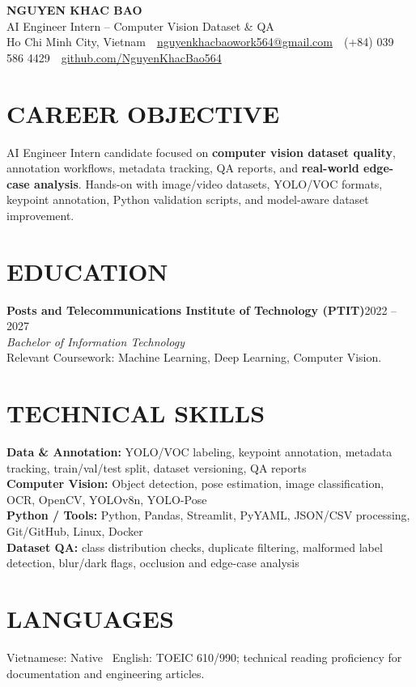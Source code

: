 \documentclass[10pt,a4paper]{article}
\newcommand{\entryhead}[2]{%
    \noindent\textbf{#1}\hfill #2\\[-2pt]
}
\newcommand{\entrysub}[1]{%
    \noindent\textit{#1}\\[-1pt]
}
\begin{document}
\fontsize{9.25}{10.15}\selectfont

\begin{center}
    {\Large\textbf{NGUYEN KHAC BAO}}\\[-1pt]
    AI Engineer Intern -- Computer Vision Dataset \& QA\\[2pt]
    Ho Chi Minh City, Vietnam
    \,\textbar\,
    \href{mailto:nguyenkhacbaowork564@gmail.com}{nguyenkhacbaowork564@gmail.com}
    \,\textbar\,
    (+84) 039 586 4429
    \,\textbar\,
    \href{https://github.com/NguyenKhacBao564}{github.com/NguyenKhacBao564}
\end{center}

\section{CAREER OBJECTIVE}
AI Engineer Intern candidate focused on \textbf{computer vision dataset quality}, annotation workflows, metadata tracking, QA reports, and \textbf{real-world edge-case analysis}. Hands-on with image/video datasets, YOLO/VOC formats, keypoint annotation, Python validation scripts, and model-aware dataset improvement.

\section{EDUCATION}
\entryhead{Posts and Telecommunications Institute of Technology (PTIT)}{2022 -- 2027}
\entrysub{Bachelor of Information Technology}
Relevant Coursework: Machine Learning, Deep Learning, Computer Vision.

\section{TECHNICAL SKILLS}
\textbf{Data \& Annotation:} YOLO/VOC labeling, keypoint annotation, metadata tracking, train/val/test split, dataset versioning, QA reports\\
\textbf{Computer Vision:} Object detection, pose estimation, image classification, OCR, OpenCV, YOLOv8n, YOLO-Pose\\
\textbf{Python / Tools:} Python, Pandas, Streamlit, PyYAML, JSON/CSV processing, Git/GitHub, Linux, Docker\\
\textbf{Dataset QA:} class distribution checks, duplicate filtering, malformed label detection, blur/dark flags, occlusion and edge-case analysis

\section{LANGUAGES}
Vietnamese: Native \textbar\ English: TOEIC 610/990; technical reading proficiency for documentation and engineering articles.
\end{document}

